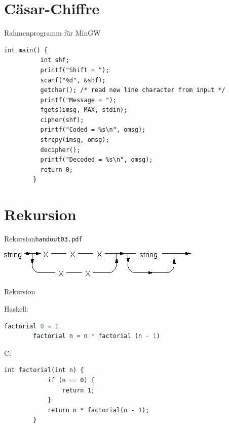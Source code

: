 \documentclass[10pt]{beamer} %
\begin{document}
\section{Cäsar-Chiffre}


\begin{frame}[fragile]{Rahmenprogramm für MinGW}

	\begin{lstlisting}[gobble=4]
		int main() {
		  int shf;
		  printf("Shift = ");
		  scanf("%d", &shf);
		  getchar(); /* read new line character from input */
		  printf("Message = ");
		  fgets(imsg, MAX, stdin);
		  cipher(shf);
		  printf("Coded = %s\n", omsg);
		  strcpy(imsg, omsg);
		  decipher();
		  printf("Decoded = %s\n", omsg);
		  return 0;
		}
	\end{lstlisting}

\end{frame}

\section{Rekursion}

\begin{frame}{Rekursion}{\texttt{handout03.pdf}}

	\begin{center}
		\includegraphics[width=0.6\linewidth]{figures/syntax-string.png}	
	\end{center}

\end{frame}

\begin{frame}[fragile]{Rekursion}

	Haskell:
	\begin{lstlisting}[gobble=4,language=Haskell]
		factorial 0 = 1
		factorial n = n * factorial (n - 1)
	\end{lstlisting}
	
	\vspace{2ex}
	
	C:
	\begin{lstlisting}[gobble=4]
		int factorial(int n) {
			if (n == 0) {
				return 1;
			}
			return n * factorial(n - 1);
		}
	\end{lstlisting}

\end{frame}
\end{document}
